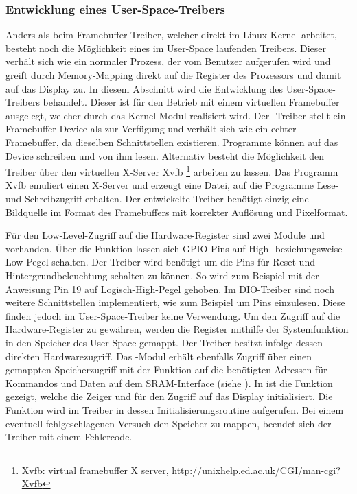 \subsubsection{Entwicklung eines User-Space-Treibers}
\label{cha:userspace}
Anders als beim Framebuffer-Treiber, welcher direkt im Linux-Kernel arbeitet, besteht noch die Möglichkeit eines im User-Space laufenden Treibers. Dieser verhält sich wie ein normaler Prozess, der vom Benutzer aufgerufen wird und greift durch Memory-Mapping direkt auf die Register des Prozessors und damit auf das Display zu.
In diesem Abschnitt wird die Entwicklung des User-Space-Treibers behandelt. 
Dieser ist für den Betrieb mit einem virtuellen Framebuffer ausgelegt, welcher durch das Kernel-Modul  realisiert wird. Der -Treiber stellt ein Framebuffer-Device als  zur Verfügung und verhält sich wie ein echter Framebuffer, da dieselben Schnittstellen existieren. Programme können auf das Device schreiben und von ihm lesen. Alternativ besteht die Möglichkeit den Treiber über den virtuellen X-Server Xvfb \footnote{Xvfb: virtual framebuffer X server, \url{http://unixhelp.ed.ac.uk/CGI/man-cgi?Xvfb}} arbeiten zu lassen. Das Programm Xvfb emuliert einen X-Server und erzeugt eine Datei, auf die Programme Lese- und Schreibzugriff erhalten. Der entwickelte Treiber benötigt einzig eine Bildquelle im Format des Framebuffers mit korrekter Auflösung und Pixelformat. 

Für den Low-Level-Zugriff auf die Hardware-Register sind zwei Module  und  vorhanden. Über die Funktion  lassen sich GPIO-Pins auf \linebreak High- beziehungsweise Low-Pegel schalten. Der Treiber wird benötigt um die Pins für Reset und Hintergrundbeleuchtung schalten zu können. So wird zum Beispiel mit der Anweisung  Pin 19 auf Logisch-High-Pegel gehoben.
Im DIO-Treiber sind noch weitere Schnittstellen implementiert, wie zum Beispiel  um Pins einzulesen. Diese finden jedoch im User-Space-Treiber keine Verwendung. Um den Zugriff auf die Hardware-Register zu gewähren, werden die Register mithilfe der Systemfunktion  in den Speicher des User-Space gemappt. Der Treiber besitzt infolge dessen direkten Hardwarezugriff.
Das -Modul erhält ebenfalls Zugriff über einen gemappten Speicherzugriff mit der Funktion  auf die benötigten Adressen für Kommandos und Daten auf dem SRAM-Interface (siehe ). In  ist die Funktion  gezeigt, welche die Zeiger  und  für den Zugriff auf das Display initialisiert. Die Funktion wird im Treiber in dessen Initialisierungsroutine aufgerufen. Bei einem eventuell fehlgeschlagenen Versuch den Speicher zu mappen, beendet sich der Treiber mit einem Fehlercode.

